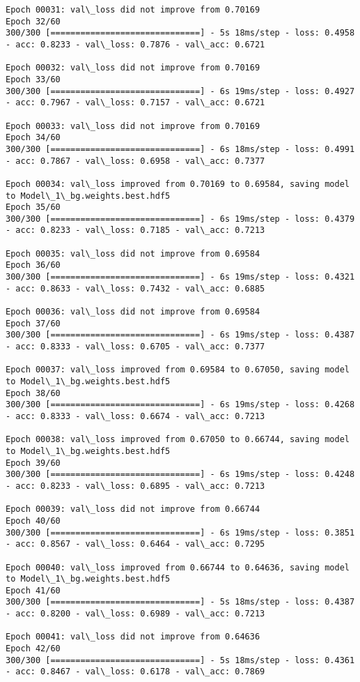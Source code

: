 \documentclass[11pt]{article}
\begin{document}
\begin{Verbatim}[commandchars=\\\{\}]
Epoch 00031: val\_loss did not improve from 0.70169
Epoch 32/60
300/300 [==============================] - 5s 18ms/step - loss: 0.4958 - acc: 0.8233 - val\_loss: 0.7876 - val\_acc: 0.6721

Epoch 00032: val\_loss did not improve from 0.70169
Epoch 33/60
300/300 [==============================] - 6s 19ms/step - loss: 0.4927 - acc: 0.7967 - val\_loss: 0.7157 - val\_acc: 0.6721

Epoch 00033: val\_loss did not improve from 0.70169
Epoch 34/60
300/300 [==============================] - 6s 18ms/step - loss: 0.4991 - acc: 0.7867 - val\_loss: 0.6958 - val\_acc: 0.7377

Epoch 00034: val\_loss improved from 0.70169 to 0.69584, saving model to Model\_1\_bg.weights.best.hdf5
Epoch 35/60
300/300 [==============================] - 6s 19ms/step - loss: 0.4379 - acc: 0.8233 - val\_loss: 0.7185 - val\_acc: 0.7213

Epoch 00035: val\_loss did not improve from 0.69584
Epoch 36/60
300/300 [==============================] - 6s 19ms/step - loss: 0.4321 - acc: 0.8633 - val\_loss: 0.7432 - val\_acc: 0.6885

Epoch 00036: val\_loss did not improve from 0.69584
Epoch 37/60
300/300 [==============================] - 6s 19ms/step - loss: 0.4387 - acc: 0.8333 - val\_loss: 0.6705 - val\_acc: 0.7377

Epoch 00037: val\_loss improved from 0.69584 to 0.67050, saving model to Model\_1\_bg.weights.best.hdf5
Epoch 38/60
300/300 [==============================] - 6s 19ms/step - loss: 0.4268 - acc: 0.8333 - val\_loss: 0.6674 - val\_acc: 0.7213

Epoch 00038: val\_loss improved from 0.67050 to 0.66744, saving model to Model\_1\_bg.weights.best.hdf5
Epoch 39/60
300/300 [==============================] - 6s 19ms/step - loss: 0.4248 - acc: 0.8233 - val\_loss: 0.6895 - val\_acc: 0.7213

Epoch 00039: val\_loss did not improve from 0.66744
Epoch 40/60
300/300 [==============================] - 6s 19ms/step - loss: 0.3851 - acc: 0.8567 - val\_loss: 0.6464 - val\_acc: 0.7295

Epoch 00040: val\_loss improved from 0.66744 to 0.64636, saving model to Model\_1\_bg.weights.best.hdf5
Epoch 41/60
300/300 [==============================] - 5s 18ms/step - loss: 0.4387 - acc: 0.8200 - val\_loss: 0.6989 - val\_acc: 0.7213

Epoch 00041: val\_loss did not improve from 0.64636
Epoch 42/60
300/300 [==============================] - 5s 18ms/step - loss: 0.4361 - acc: 0.8467 - val\_loss: 0.6178 - val\_acc: 0.7869


\end{Verbatim}
\end{document}

